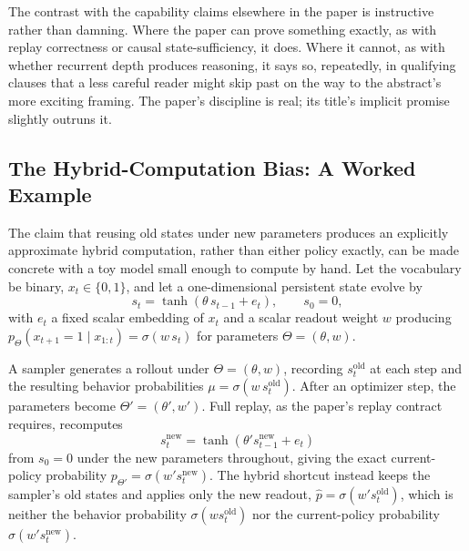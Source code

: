 \documentclass[11pt]{article}
\begin{document}
The contrast with the capability claims elsewhere in the paper is instructive rather than damning. Where the paper can prove something exactly, as with replay correctness or causal state-sufficiency, it does. Where it cannot, as with whether recurrent depth produces reasoning, it says so, repeatedly, in qualifying clauses that a less careful reader might skip past on the way to the abstract's more exciting framing. The paper's discipline is real; its title's implicit promise slightly outruns it.

\subsection{The Hybrid-Computation Bias: A Worked Example}

The claim that reusing old states under new parameters produces an explicitly approximate hybrid computation, rather than either policy exactly, can be made concrete with a toy model small enough to compute by hand. Let the vocabulary be binary, $x_t \in \{0,1\}$, and let a one-dimensional persistent state evolve by
\[
s_t = \tanh(\theta\, s_{t-1} + e_t), \qquad s_0 = 0,
\]
with $e_t$ a fixed scalar embedding of $x_t$ and a scalar readout weight $w$ producing $p_\Theta(x_{t+1}=1 \mid x_{1:t}) = \sigma(w\, s_t)$ for parameters $\Theta = (\theta, w)$.

A sampler generates a rollout under $\Theta = (\theta, w)$, recording $s_t^{\mathrm{old}}$ at each step and the resulting behavior probabilities $\mu = \sigma(w\, s_t^{\mathrm{old}})$. After an optimizer step, the parameters become $\Theta' = (\theta', w')$. Full replay, as the paper's replay contract requires, recomputes
\[
s_t^{\mathrm{new}} = \tanh(\theta' s_{t-1}^{\mathrm{new}} + e_t)
\]
from $s_0 = 0$ under the new parameters throughout, giving the exact current-policy probability $p_{\Theta'} = \sigma(w' s_t^{\mathrm{new}})$. The hybrid shortcut instead keeps the sampler's old states and applies only the new readout, $\hat p = \sigma(w' s_t^{\mathrm{old}})$, which is neither the behavior probability $\sigma(w s_t^{\mathrm{old}})$ nor the current-policy probability $\sigma(w' s_t^{\mathrm{new}})$.
\end{document}
